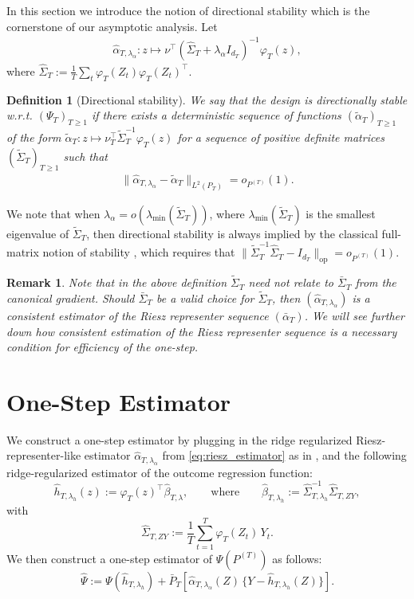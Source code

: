 \documentclass[11pt]{article}
\newtheorem{rem}{Remark}
\newtheorem{defn}{Definition}
\begin{document}
In this section we introduce the notion of directional stability which is the cornerstone of our asymptotic analysis. Let
\begin{align}
   \widehat \alpha_{T, \lambda_\alpha} : z \mapsto \nu^\top \left(\widehat \Sigma_T + \lambda_{\alpha} I_{d_T} \right)^{-1}\varphi_T(z), \label{eq:riesz_estimator}
\end{align}
where $\widehat \Sigma_T := \frac{1}{T} \sum_t \varphi_T(Z_t) \varphi_T(Z_t)^\top$.
\begin{defn}[Directional stability]\label{def:dir_stab}
    We say that the design is directionally stable w.r.t. $(\Psi_T)_{T\geq 1}$ if there exists a deterministic sequence of functions $(\widetilde \alpha_T)_{T\geq 1}$ of the form $\widetilde \alpha_T : z \mapsto \nu_T^\top \widetilde \Sigma_T^{-1} \varphi_T(z)$ for a sequence of positive definite matrices $(\widetilde \Sigma_T)_{T \geq 1}$ such that 
    \begin{align}
        \|  \widehat \alpha_{T, \lambda_\alpha} - \widetilde \alpha_T \|_{L^2(P_T)} = o_{P^{(T)}}(1).
    \end{align}
\end{defn}
%
We note that when $\lambda_\alpha = o(\lambda_{\min}(\widetilde \Sigma_T))$, where $\lambda_{\min}(\widetilde \Sigma_T)$ is the smallest eigenvalue of $\widetilde \Sigma_T$, then directional stability is always implied by the classical full-matrix notion of stability \citep{laiweiaos1982}, which requires that $\| \widetilde \Sigma_T^{-1} \widehat \Sigma_T - I_{d_T} \|_{\mathrm{op}} = o_{P^{(T)}}(1)$. 

\begin{rem}
    Note that in the above definition $\widetilde \Sigma_T$ need not relate to $\bar \Sigma_T$ from the canonical gradient. Should $\bar \Sigma_T$ be a valid choice for $\widetilde \Sigma_T$, then $(\widehat \alpha_{T, \lambda_\alpha})$ is a consistent estimator of the Riesz representer sequence $(\bar \alpha_T)$. We will see further down how consistent estimation of the Riesz representer sequence is a necessary condition for efficiency of the one-step. 
\end{rem}

\section{One-Step Estimator}
\label{sec:one_step_estimator}

We construct a one-step estimator by plugging in the ridge regularized Riesz-representer-like estimator $\widehat{\alpha}_{T, \lambda_\alpha}$ from \eqref{eq:riesz_estimator} as in \citep{chernozhukov2022automatic}, and the following ridge-regularized estimator of the outcome regression function: 
\[
\widehat h_{T,\lambda_h}(z)
:= \varphi_T(z)^\top \widehat\beta_{T,\lambda},
\qquad \text{where} \qquad
\widehat\beta_{T,\lambda_h}
:= \widehat\Sigma_{T,\lambda_h}^{-1}\widehat\Sigma_{T,ZY},
\]
with
\[
\widehat\Sigma_{T,ZY}
:= \frac{1}{T}\sum_{t=1}^T \varphi_T(Z_t)\,Y_t .
\]
We then construct a one-step estimator of $\Psi(P^{(T)})$ as follows:
\[
\widehat \Psi
:= \Psi(\widehat h_{T, \lambda_h})
+ \bar P_T \left[
\widehat\alpha_{T,\lambda_\alpha}(Z)\,\{Y-\widehat h_{T,\lambda_h}(Z)\}
\right].
\]
\end{document}
